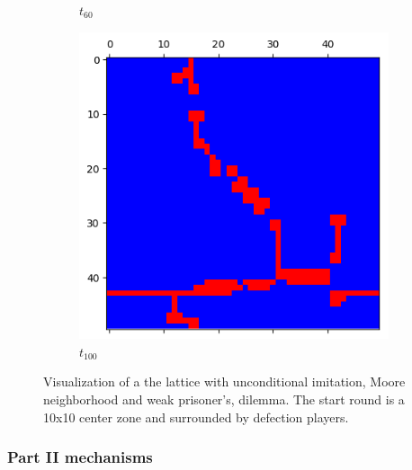\documentclass[letterpaper]{article}
\begin{document}
\begin{figure}[H]
\begin{subfigure}{.33\textwidth}
      \caption{$t_{60}$}
    \end{subfigure}
    \begin{subfigure}{.33\textwidth}
      \centering
      \includegraphics[width=1\linewidth]{images/assign2/part31-defect/t100}
      \caption{$t_{100}$}
    \end{subfigure}
    \caption{Visualization of a the lattice with unconditional imitation,
    Moore neighborhood and weak prisoner's, dilemma. The start round is
    a 10x10 center zone and surrounded by defection players.}
    \label{fig:visupart31-defect}
\end{figure}


\subsubsection{Part II mechanisms}
\end{document}
